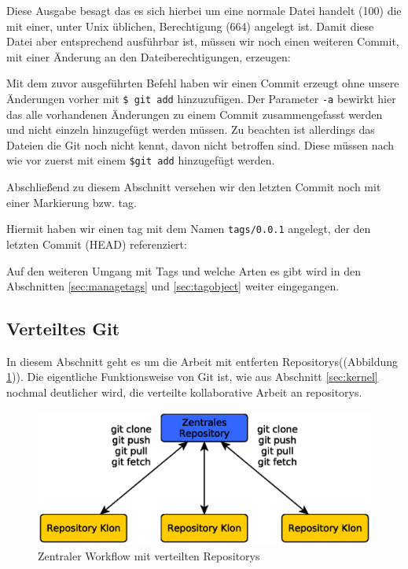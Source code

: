 

Diese Ausgabe besagt das es sich hierbei um eine normale Datei handelt (100)
die mit einer, unter Unix üblichen, Berechtigung (664) angelegt ist. Damit
diese Datei aber entsprechend ausführbar ist, müssen wir noch einen weiteren
Commit, mit einer Änderung an den Dateiberechtigungen, erzeugen:



Mit dem zuvor ausgeführten Befehl haben wir einen Commit erzeugt ohne unsere
Änderungen vorher mit \texttt{\$ git add} hinzuzufügen. Der Parameter
\texttt{-a} bewirkt hier das alle vorhandenen Änderungen zu einem Commit
zusammengefasst werden und nicht einzeln hinzugefügt werden müssen. Zu beachten
ist allerdings das Dateien die Git noch nicht kennt, davon nicht betroffen
sind. Diese müssen nach wie vor zuerst mit einem \texttt{\$git add} hinzugefügt
werden.

Abschließend zu diesem Abschnitt versehen wir den letzten Commit noch mit einer
Markierung bzw. \gls{tag}.



Hiermit haben wir einen \gls{tag} mit dem Namen \texttt{tags/0.0.1} angelegt,
der den letzten Commit (\gls{HEAD}) referenziert:



Auf den weiteren Umgang mit Tags und welche Arten es gibt wird in den
Abschnitten \ref{sec:managetags} und \ref{sec:tagobject} weiter eingegangen.

\subsection{Verteiltes Git}\label{sec:distributed}
In diesem Abschnitt geht es um die Arbeit mit entferten Repositorys((Abbildung
\ref{fig:centralworkflow})). Die eigentliche Funktionsweise von Git ist, wie
aus Abschnitt \ref{sec:kernel} nochmal deutlicher wird, die verteilte
kollaborative Arbeit an \glspl{repository}.

\begin{figure}[h]
  \centering
  \includegraphics[scale=0.70]{images/workflow.eps}
  \caption{Zentraler Workflow mit verteilten Repositorys\cite[S.~138]{gitosp}}
  \label{fig:centralworkflow}
\end{figure}

